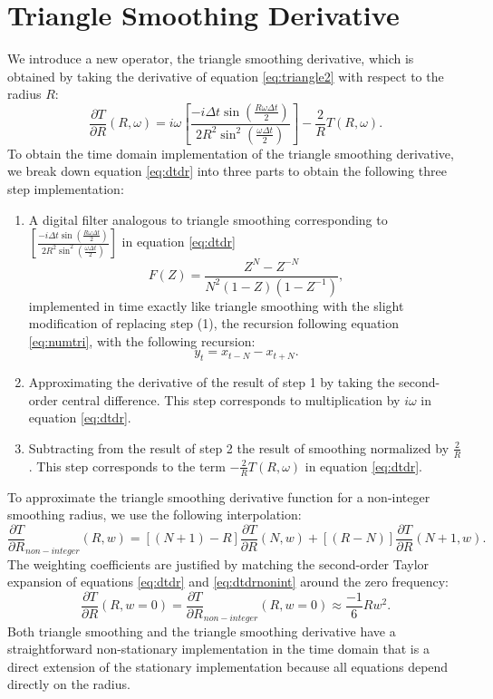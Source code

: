 \section{Triangle Smoothing Derivative}
We introduce a new operator, the triangle smoothing derivative, which is obtained by taking the derivative of equation \ref{eq:triangle2} with respect to the radius $R$:
\begin{equation}
\frac{\partial T}{\partial R}(R,\omega) = i\omega \left[\frac{-i \Delta t \sin(\frac{R\omega \Delta t}{2})}{2R^2\sin^2(\frac{\omega \Delta t}{2})}\right] - \frac{2}{R}T(R,\omega).
\label{eq:dtdr}
\end{equation}
To obtain the time domain implementation of the triangle smoothing derivative, we break down equation \ref{eq:dtdr} into three parts to obtain the following three step implementation:
\begin{enumerate}
    \item A digital filter analogous to triangle smoothing corresponding to $\left[\frac{-i \Delta t \sin(\frac{R\omega \Delta t}{2})}{2R^2\sin^2(\frac{\omega \Delta t}{2})}\right]$ in equation \ref{eq:dtdr}
    \begin{equation}
    F(Z)=\frac{Z^N-Z^{-N}}{N^2(1-Z)(1-Z^{-1})},
    \end{equation}
    implemented in time exactly like triangle smoothing with the slight modification of replacing step (1), the recursion following equation \ref{eq:numtri}, with the following recursion: 
    \begin{equation}
        y_{t} = x_{t-N}-x_{t+N}.
    \end{equation}
    \item Approximating the derivative of the result of step 1 by taking the second-order central difference. This step corresponds to multiplication by $i\omega$ in equation \ref{eq:dtdr}.
    \item Subtracting from the result of step 2 the result of smoothing normalized by $\frac{2}{R}$. This step corresponds to the term $-\frac{2}{R}T(R,\omega)$ in equation \ref{eq:dtdr}.
\end{enumerate}
To approximate the triangle smoothing derivative function for a non-integer smoothing radius, we use the following interpolation:
\begin{equation}
\frac{\partial T}{\partial R}_{non-integer}(R,w) = [(N+1)-R]\frac{\partial T}{\partial R}(N,w) + [(R-N)]\frac{\partial T}{\partial R}(N+1,w).
\label{eq:dtdrnonint}
\end{equation}
The weighting coefficients are justified by matching the second-order Taylor expansion of equations \ref{eq:dtdr} and \ref{eq:dtdrnonint} around the zero frequency:
\begin{equation}
\frac{\partial T}{\partial R}(R,w=0)=\frac{\partial T}{\partial R}_{non-integer}(R,w=0) \approx \frac{-1}{6}Rw^2.
\end{equation}
Both triangle smoothing and the triangle smoothing derivative have a straightforward non-stationary implementation in the time domain that is a direct extension of the stationary implementation because all equations depend directly on the radius.

